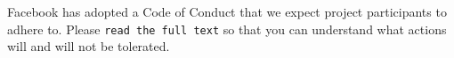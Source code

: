 Facebook has adopted a Code of Conduct that we expect project participants to adhere to. Please {\tt read the full text} so that you can understand what actions will and will not be tolerated. 